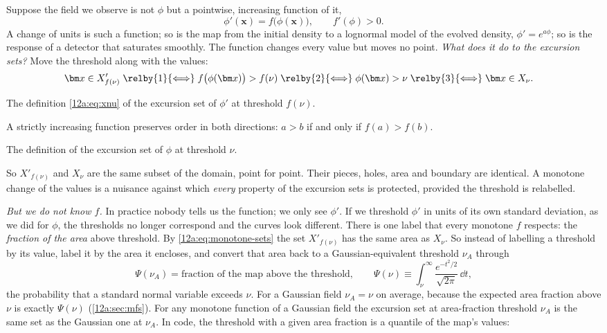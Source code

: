 Suppose the field we observe is not $\phi$ but a pointwise, increasing function of it,
\begin{equation}
  \phi'(\bm x)=f\big(\phi(\bm x)\big),\qquad f'(\phi)>0 .
  \label{12a:eq:monotone}
\end{equation}
A change of units is such a function; so is the map from the initial density to a lognormal model of the
evolved density, $\phi'=e^{a\phi}$; so is the response of a detector that saturates smoothly. The function
changes every value but moves no point. \emph{What does it do to the excursion sets?} Move the threshold
along with the values:
\begin{align}
  \bm x\in X'_{f(\nu)}
  \;&\relby{1}{\Longleftrightarrow}\; f\big(\phi(\bm x)\big)>f(\nu)
  \;\relby{2}{\Longleftrightarrow}\; \phi(\bm x)>\nu
  \;\relby{3}{\Longleftrightarrow}\; \bm x\in X_\nu .
  \label{12a:eq:monotone-sets}
\end{align}
\begin{explain}
  \item The definition \eqref{12a:eq:xnu} of the excursion set of $\phi'$ at threshold $f(\nu)$.
  \item A strictly increasing function preserves order in both directions: $a>b$ if and only if
        $f(a)>f(b)$.
  \item The definition of the excursion set of $\phi$ at threshold $\nu$.
\end{explain}
So $X'_{f(\nu)}$ and $X_\nu$ are the same subset of the domain, point for point. Their pieces, holes, area and
boundary are identical. A monotone change of the values is a nuisance against which \emph{every} property of
the excursion sets is protected, provided the threshold is relabelled.

\emph{But we do not know $f$.} In practice nobody tells us the function; we only see $\phi'$. If we
threshold $\phi'$ in units of its own standard deviation, as we did for $\phi$, the thresholds no longer
correspond and the curves look different. There is one label that every monotone $f$ respects: the
\emph{fraction of the area} above threshold. By \eqref{12a:eq:monotone-sets} the set $X'_{f(\nu)}$ has the
same area as $X_\nu$. So instead of labelling a threshold by its value, label it by the area it encloses,
and convert that area back to a Gaussian-equivalent threshold $\nu_A$ through
\begin{equation}
  \Psi(\nu_A)=\text{fraction of the map above the threshold},\qquad
  \Psi(\nu)\equiv\int_\nu^\infty\frac{e^{-t^2/2}}{\sqrt{2\pi}}\,\dd t ,
  \label{12a:eq:nuA}
\end{equation}
the probability that a standard normal variable exceeds $\nu$. For a Gaussian field $\nu_A=\nu$ on average,
because the expected area fraction above $\nu$ is exactly $\Psi(\nu)$ (\cref{12a:sec:mfs}). For any monotone
function of a Gaussian field the excursion set at area-fraction threshold $\nu_A$ is the same set as the
Gaussian one at $\nu_A$. In code, the threshold with a given area fraction is a quantile of the map's values:

